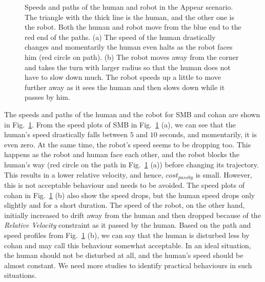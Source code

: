 \begin{figure}[h!]
\begin{subfigure}{.45\columnwidth}
\end{subfigure}
\caption{Speeds and paths of the human and robot in the Appear scenario. The triangle with the thick line is the human, and the other one is the robot. Both the human and robot move from the blue end to the red end of the paths. (a) The speed of the human drastically changes and momentarily the human even halts as the robot faces him (red circle on path). (b) The robot moves away from the corner and takes the turn with larger radius so that the human does not have to slow down much. The robot speeds up a little to move further away as it sees the human and then slows down while it passes by him.}
\label{fig:vel_plots}
\end{figure}    

The speeds and paths of the human and the robot for SMB and \acrshort{cohan} are shown in Fig.~\ref{fig:vel_plots}. From the speed plots of SMB in Fig.~\ref{fig:vel_plots} (a), we can see that the human's speed drastically falls between $5$ and $10$ seconds, and momentarily, it is even zero. At the same time, the robot's speed seems to be dropping too. This happens as the robot and human face each other, and the robot blocks the human's way (red circle on the path in Fig.~\ref{fig:vel_plots} (a)) before changing its trajectory. This results in a lower relative velocity, and hence, $cost_{passby}$ is small. However, this is not acceptable behaviour and needs to be avoided. The speed plots of \acrshort{cohan} in Fig.~\ref{fig:vel_plots} (b) also show the speed drops, but the human speed drops only slightly and for a short duration. The speed of the robot, on the other hand, initially increased to drift away from the human and then dropped because of the \textit{Relative Velocity} constraint as it passed by the human. Based on the path and speed profiles from Fig.~\ref{fig:vel_plots} (b), we can say that the human is disturbed less by \acrshort{cohan} and may call this behaviour somewhat acceptable. In an ideal situation, the human should not be disturbed at all, and the human's speed should be almost constant. We need more studies to identify practical behaviours in such situations.


